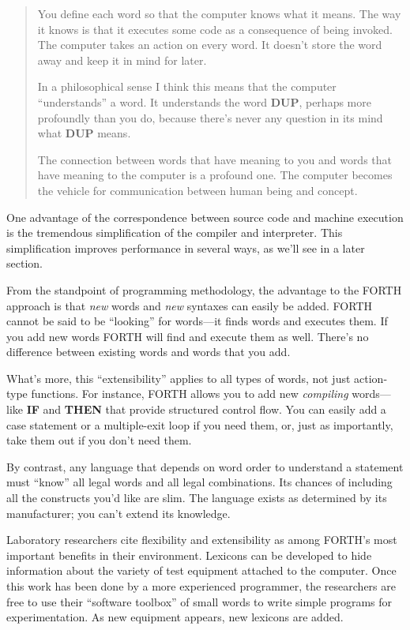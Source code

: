 \begin{quote}
You define each word so that the computer knows what it means. The
way it knows is that it executes some code as a consequence of being
invoked. The computer takes an action on every word. It doesn't store
the word away and keep it in mind for later.

In a philosophical sense I think this means that the computer {}``understands''
a word. It understands the word \textbf{DUP}, perhaps more profoundly
than you do, because there's never any question in its mind what \textbf{DUP}
means.

The connection between words that have meaning to you and words that
have meaning to the computer is a profound one. The computer becomes
the vehicle for communication between human being and concept.
\end{quote}
One advantage of the correspondence between source code and machine
execution is the tremendous simplification of the compiler and interpreter.
This simplification improves performance in several ways, as we'll
see in a later section.

From the standpoint of programming methodology, the advantage to the
FORTH approach is that \emph{new} words and \emph{new} syntaxes can
easily be added. FORTH cannot be said to be {}``looking'' for words---it
finds words and executes them. If you add new words FORTH will find
and execute them as well. There's no difference between existing words
and words that you add.

What's more, this {}``extensibility'' applies to all types of words,
not just action-type functions. For instance, FORTH allows you to
add new \emph{compiling} words---like \textbf{IF} and \textbf{THEN}
that provide structured control flow. You can easily add a case statement
or a multiple-exit loop if you need them, or, just as importantly,
take them out if you don't need them.

By contrast, any language that depends on word order to understand
a statement must {}``know'' all legal words and all legal combinations.
Its chances of including all the constructs you'd like are slim. The
language exists as determined by its manufacturer; you can't extend
its knowledge.

Laboratory researchers cite flexibility and extensibility as among
FORTH's most important benefits in their environment. Lexicons can
be developed to hide information about the variety of test equipment
attached to the computer. Once this work has been done by a more experienced
programmer, the researchers are free to use their {}``software toolbox''
of small words to write simple programs for experimentation. As new
equipment appears, new lexicons are added.

